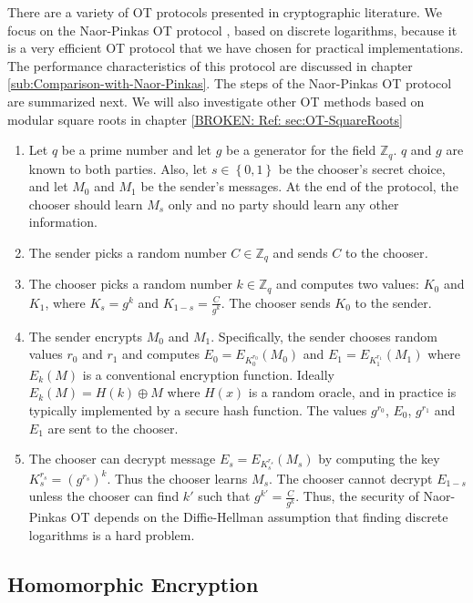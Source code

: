There are a variety of OT protocols presented in cryptographic literature.
We focus on the Naor-Pinkas OT protocol \cite{NaorPinkas99}, based
on discrete logarithms, because it is a very efficient OT protocol
that we have chosen for practical implementations. The performance
characteristics of this protocol are discussed in chapter \ref{sub:Comparison-with-Naor-Pinkas}.
The steps of the Naor-Pinkas OT protocol are summarized next. We will
also investigate other OT methods based on modular square roots in
chapter \ref{BROKEN: Ref: sec:OT-SquareRoots}
\begin{enumerate}
\item Let $q$ be a prime number and let $g$ be a generator for the field
$\mathbb{Z}_{q}$. $q$ and $g$ are known to both parties. Also,
let $s\in\left\{ 0,1\right\} $ be the chooser's secret choice, and
let $M_{0}$ and $M_{1}$ be the sender's messages. At the end of
the protocol, the chooser should learn $M_{s}$ only and no party
should learn any other information.
\item The sender picks a random number $C\in\mathbb{Z}_{q}$ and sends $C$
to the chooser\emph{.}
\item The chooser picks a random number $k\in\mathbb{Z}_{q}$ and computes
two values: $K_{0}$ and $K_{1}$, where $K_{s}=g^{k}$ and $K_{1-s}=\frac{C}{g^{k}}$.
The chooser sends $K_{0}$ to the sender.
\item The sender encrypts $M_{0}$ and $M_{1}$. Specifically, the sender
chooses random values $r_{0}$ and $r_{1}$ and computes $E_{0}=E_{K_{0}^{r_{0}}}\left(M_{0}\right)$
and $E_{1}=E_{K_{1}^{r_{1}}}\left(M_{1}\right)$ where $E_{k}\left(M\right)$
is a conventional encryption function. Ideally $E_{k}\left(M\right)=H\left(k\right)\oplus M$
where $H\left(x\right)$ is a random oracle, and in practice is typically
implemented by a secure hash function. The values $g^{r_{0}}$, $E_{0}$,
$g^{r_{1}}$ and $E_{1}$ are sent to the chooser.
\item The chooser can decrypt message $E_{s}=E_{K_{s}^{r_{s}}}\left(M_{s}\right)$
by computing the key $K_{s}^{r_{s}}=\left(g^{r_{s}}\right)^{k}$.
Thus the chooser learns $M_{s}$. The chooser cannot decrypt $E_{1-s}$
unless the chooser can find $k'$ such that $g^{k'}=\frac{C}{g^{k}}$.
Thus, the security of Naor-Pinkas OT depends on the Diffie-Hellman
assumption that finding discrete logarithms is a hard problem.
\end{enumerate}

\subsection{Homomorphic Encryption}

